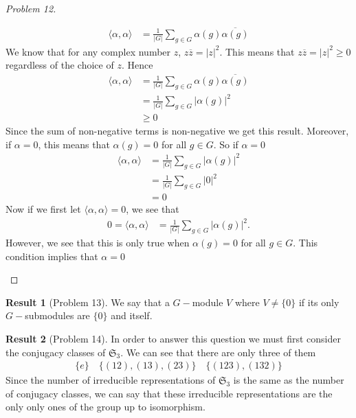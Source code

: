 \documentclass[titlepage]{article}
\theoremstyle{plain}
\theoremstyle{definition}
\newtheorem{result}{Result}[section]
\theoremstyle{remark}
\theoremstyle{exercise-style}
\numberwithin{equation}{section}
\numberwithin{theorem}{section}
\numberwithin{remark}{section}
\begin{document}
\begin{proof}[Problem 12]
\begin{enumerate}[(a)]
        \begin{align}
            \langle \alpha , \alpha \rangle &= \frac{1}{|G|} \sum_{g \in G} \alpha(g) \overline{\alpha(g)}
        \end{align}
        We know that for any complex number $z$, $z \overline{z} = |z|^2$. This means that $z \overline{z} = |z|^2 \geq 0$ regardless of the choice of $z$. Hence
        \begin{align}
            \langle \alpha , \alpha \rangle &= \frac{1}{|G|} \sum_{g \in G} \alpha(g) \overline{\alpha(g)} \\
            &= \frac{1}{|G|} \sum_{g \in G} |\alpha(g)|^2 \\
            &\geq 0
        \end{align}
        Since the sum of non-negative terms is non-negative we get this result. Moreover, if $\alpha = 0$, this means that $\alpha(g)=0$ for all $g \in G$. So if $\alpha = 0$
        \begin{align}
            \langle \alpha , \alpha \rangle &= \frac{1}{|G|} \sum_{g \in G} |\alpha(g)|^2 \\
            &= \frac{1}{|G|} \sum_{g \in G} |0|^2 \\
            &= 0
        \end{align}
        Now if we first let $\langle \alpha , \alpha \rangle = 0$, we see that
        \begin{align}
            0 = \langle \alpha , \alpha \rangle &= \frac{1}{|G|} \sum_{g \in G} |\alpha(g)|^2.
        \end{align}
        However, we see that this is only true when $\alpha(g)=0$ for all $g \in G$. This condition implies that $\alpha =0$
    \end{enumerate}
\end{proof}

\begin{result}[Problem 13]
    We say that a $G-$module $V$ where $V \neq \{ 0 \}$ if its only $G-$submodules are $\{0 \}$ and itself.
\end{result}

\begin{result}[Problem 14]
    In order to answer this question we must first consider the conjugacy classes of $\mathfrak{S}_3$. We can see that there are only three of them
    \begin{align}
        \{ e \} \quad \{ (12), (13), (23) \} \quad \{ (123), (132) \}
    \end{align}
    Since the number of irreducible representations of $\mathfrak S_3$ is the same as the number of conjugacy classes, we can say that these irreducible representations are the only only ones of the group up to isomorphism.  
\end{result}
\end{document}

